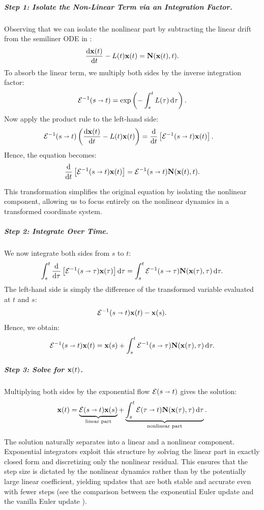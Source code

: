 \subparagraph{Step 1: Isolate the Non-Linear Term via an Integration Factor.}
Observing that we can isolate the nonlinear part by subtracting the linear drift from the semiliner ODE in :
\[
\frac{\mathop{}\!\mathrm{d} {\mathbf{x}}(t)}{\mathop{}\!\mathrm{d} t} - L(t){\mathbf{x}}(t) = {\mathbf{N}}({\mathbf{x}}(t), t).
\]
To absorb the linear term, we multiply both sides by the inverse integration factor:
\[
\mathcal{E}^{-1}(s \shortrightarrow t) = \exp\left(-\int_s^t L(\tau)\mathop{}\!\mathrm{d} \tau \right).
\]
Now apply the product rule to the left-hand side:
\begin{align*}
\mathcal{E}^{-1}(s \shortrightarrow t) \left( \frac{\mathop{}\!\mathrm{d} {\mathbf{x}}(t)}{\mathop{}\!\mathrm{d} t} - L(t){\mathbf{x}}(t) \right)
&= \frac{\mathop{}\!\mathrm{d}}{\mathop{}\!\mathrm{d} t} \left[ \mathcal{E}^{-1}(s \shortrightarrow t) {\mathbf{x}}(t) \right].
\end{align*}
Hence, the equation becomes:
\[
\frac{\mathop{}\!\mathrm{d}}{\mathop{}\!\mathrm{d} t} \left[ \mathcal{E}^{-1}(s \shortrightarrow t) {\mathbf{x}}(t) \right]
= \mathcal{E}^{-1}(s \shortrightarrow t) {\mathbf{N}}({\mathbf{x}}(t), t).
\]

This transformation simplifies the original equation by isolating the nonlinear component, allowing us to focus entirely on the nonlinear dynamics in a transformed coordinate system.

\subparagraph{Step 2: Integrate Over Time.}
We now integrate both sides from $s$ to $t$:
\[
\int_s^t \frac{\mathop{}\!\mathrm{d}}{\mathop{}\!\mathrm{d} \tau} \left[ \mathcal{E}^{-1}(s \shortrightarrow \tau) {\mathbf{x}}(\tau) \right] \mathop{}\!\mathrm{d} \tau
= \int_s^t \mathcal{E}^{-1}(s \shortrightarrow \tau) {\mathbf{N}}({\mathbf{x}}(\tau), \tau)\mathop{}\!\mathrm{d} \tau.
\]
The left-hand side is simply the difference of the transformed variable evaluated at $t$ and $s$:
\[
\mathcal{E}^{-1}(s \shortrightarrow t) {\mathbf{x}}(t) - {\mathbf{x}}(s).
\]
Hence, we obtain:
\[
\mathcal{E}^{-1}(s \shortrightarrow t) {\mathbf{x}}(t)
= {\mathbf{x}}(s) + \int_s^t \mathcal{E}^{-1}(s \shortrightarrow \tau) {\mathbf{N}}({\mathbf{x}}(\tau), \tau)\mathop{}\!\mathrm{d} \tau.
\]

\subparagraph{Step 3: Solve for ${\mathbf{x}}(t)$.}
Multiplying both sides by the exponential flow $\mathcal{E}(s \shortrightarrow t)$ gives the solution:
\begin{align}\label{eq:exp-int-factor-integration}
    {\mathbf{x}}(t) = \underbrace{\mathcal{E}(s \shortrightarrow t)  {\mathbf{x}}(s)}_{\text{linear part}} + \underbrace{\int_s^t \mathcal{E}(\tau \shortrightarrow t) {\mathbf{N}}({\mathbf{x}}(\tau), \tau)\mathop{}\!\mathrm{d} \tau}_{\text{nonlinear part}} .
\end{align}

The solution naturally separates into a linear and a nonlinear component. Exponential integrators exploit this structure by solving the linear part in exactly closed form and discretizing only the nonlinear residual. This ensures that the step size is dictated by the nonlinear dynamics rather than by the potentially large linear coefficient, yielding updates that are both stable and accurate even with fewer steps (see the comparison between the exponential Euler update  and the vanilla Euler update ).  






